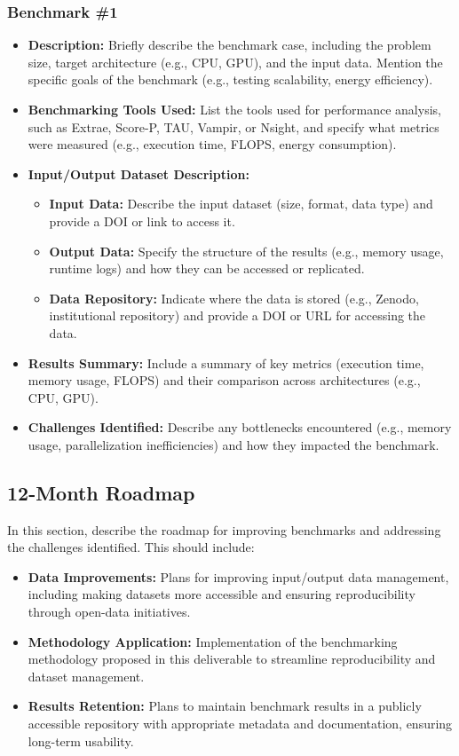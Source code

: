 \subsubsection{Benchmark \#1}
\begin{itemize}
    \item \textbf{Description:} Briefly describe the benchmark case, including the problem size, target architecture (e.g., CPU, GPU), and the input data. Mention the specific goals of the benchmark (e.g., testing scalability, energy efficiency).
    \item \textbf{Benchmarking Tools Used:} List the tools used for performance analysis, such as Extrae, Score-P, TAU, Vampir, or Nsight, and specify what metrics were measured (e.g., execution time, FLOPS, energy consumption).
    \item \textbf{Input/Output Dataset Description:}
        \begin{itemize}
            \item \textbf{Input Data:} Describe the input dataset (size, format, data type) and provide a DOI or link to access it.
            \item \textbf{Output Data:} Specify the structure of the results (e.g., memory usage, runtime logs) and how they can be accessed or replicated.
            \item \textbf{Data Repository:} Indicate where the data is stored (e.g., Zenodo, institutional repository) and provide a DOI or URL for accessing the data.
        \end{itemize}
    \item \textbf{Results Summary:} Include a summary of key metrics (execution time, memory usage, FLOPS) and their comparison across architectures (e.g., CPU, GPU).
    \item \textbf{Challenges Identified:} Describe any bottlenecks encountered (e.g., memory usage, parallelization inefficiencies) and how they impacted the benchmark.
\end{itemize}

\subsection{12-Month Roadmap}
\label{sec:WP4:Hawen:roadmap}

In this section, describe the roadmap for improving benchmarks and addressing the challenges identified. This should include:
\begin{itemize}
    \item \textbf{Data Improvements:} Plans for improving input/output data management, including making datasets more accessible and ensuring reproducibility through open-data initiatives.
    \item \textbf{Methodology Application:} Implementation of the benchmarking methodology proposed in this deliverable to streamline reproducibility and dataset management.
    \item \textbf{Results Retention:} Plans to maintain benchmark results in a publicly accessible repository with appropriate metadata and documentation, ensuring long-term usability.
\end{itemize}


